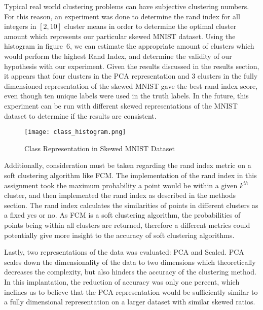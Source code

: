 Typical real world clustering problems can have subjective clustering numbers. For this reason, an experiment was done to determine the rand index for all integers in $[2,10]$ cluster means in order to determine the optimal cluster amount which represents our particular skewed MNIST dataset. Using the histogram in figure~6, we can estimate the appropriate amount of clusters which would perform the highest Rand Index, and determine the validity of our hypothesis with our experiment. Given the results discussed in the results section, it appears that four clusters in the PCA representation and 3 clusters in the fully dimensioned representation of the skewed MNIST gave the best rand index score, even though ten unique labels were used in the truth labels. In the future, this experiment can be run with different skewed representations of the MNIST dataset to determine if the results are consistent. \par

\begin{figure}[H]
    \centering
    \texttt{[image: class\_histogram.png]}
    \caption{Class Representation in Skewed MNIST Dataset\label{fig:hist1}}    
\end{figure}

Additionally, consideration must be taken regarding the rand index metric on a soft clustering algorithm like FCM. The implementation of the rand index in this assignment took the maximum probability a point would be within a given $k^{th}$ cluster, and then implemented the rand index as described in the methods section. The rand index calculates the similarities of points in different clusters as a fixed yes or no. As FCM is a soft clustering algorithm, the probabilities of points being within all clusters are returned, therefore a different metrics could potentially give more insight to the accuracy of soft clustering algorithms. \par

Lastly, two representations of the data was evaluated: PCA and Scaled. PCA scales down the dimensionality of the data to two dimensions which theoretically decreases the complexity, but also hinders the accuracy of the clustering method. In this implantation, the reduction of accuracy was only one percent, which inclines us to believe that the PCA representation would be sufficiently similar to a fully dimensional representation on a larger dataset with similar skewed ratios. \par